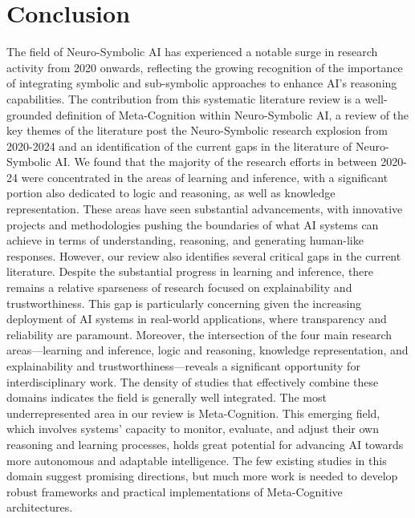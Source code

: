 \documentclass[hf]{ceurart}
\begin{document}
\section{Conclusion}\label{sec:conclusion}
The field of Neuro-Symbolic AI has experienced a notable surge in research activity from 2020 onwards, reflecting the growing recognition of the importance of integrating symbolic and sub-symbolic approaches to enhance AI's reasoning capabilities. The contribution from this systematic literature review is a well-grounded definition of Meta-Cognition within Neuro-Symbolic AI,  a review of the key themes of the literature post the Neuro-Symbolic research explosion from 2020-2024 and an identification of the current gaps in the literature of Neuro-Symbolic AI. We found that the majority of the research efforts in between 2020-24 were concentrated in the areas of learning and inference, with a significant portion also dedicated to logic and reasoning, as well as knowledge representation. These areas have seen substantial advancements, with innovative projects and methodologies pushing the boundaries of what AI systems can achieve in terms of understanding, reasoning, and generating human-like responses. However, our review also identifies several critical gaps in the current literature. Despite the substantial progress in learning and inference, there remains a relative sparseness of research focused on explainability and trustworthiness. This gap is particularly concerning given the increasing deployment of AI systems in real-world applications, where transparency and reliability are paramount. Moreover, the intersection of the four main research areas—learning and inference, logic and reasoning, knowledge representation, and explainability and trustworthiness—reveals a significant opportunity for interdisciplinary work. The density of studies that effectively combine these domains indicates the field is generally well integrated. The most underrepresented area in our review is Meta-Cognition. This emerging field, which involves systems' capacity to monitor, evaluate, and adjust their own reasoning and learning processes, holds great potential for advancing AI towards more autonomous and adaptable intelligence. The few existing studies in this domain suggest promising directions, but much more work is needed to develop robust frameworks and practical implementations of Meta-Cognitive architectures.


\renewcommand{\bibfont}{\scriptsize}
\setlength{\bibsep}{0pt}
\setlength{\itemsep}{0pt plus 0.3ex}



\appendix
\end{document}
